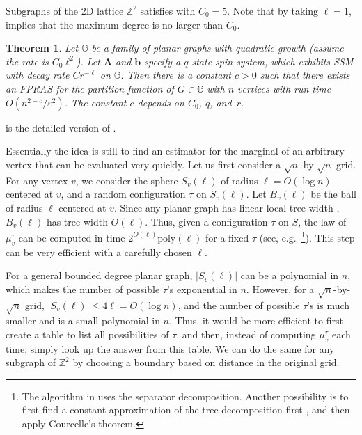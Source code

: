 \documentclass[11pt]{amsart}
\def\=#1{\mathbb{#1}}
\newcommand{\abs}[1]{\ensuremath{\left\vert#1\right\vert}}
\newcommand{\eps}{\varepsilon}
\newtheorem{theorem}{Theorem}
\theoremstyle{definition}
\theoremstyle{remark}
\begin{document}
Subgraphs of the 2D lattice $\=Z^2$ satisfies  with $C_0=5$.
Note that by taking $\ell=1$,  implies that the maximum degree is no larger than $C_0$.

\begin{theorem}\label{lattice-counting}
  Let $\=G$ be a family of planar graphs with quadratic growth (assume the rate is $C_0\ell^2$).
  Let ${\bm A}$ and ${\bm b}$ specify a $q$-state spin system, which exhibits SSM with decay rate $Cr^{-\ell}$ on $\=G$.
  Then there is a constant $c>0$ such that there exists an FPRAS for the partition function of $G\in\=G$ with $n$ vertices with run-time $\widetilde{O}(n^{2-c}/\eps^2)$.
  The constant $c$ depends on $C_0$, $q$, and~$r$.
\end{theorem}

 is the detailed version of .

Essentially the idea is still to find an estimator for the marginal of an arbitrary vertex that can be evaluated very quickly.
Let us first consider a $\sqrt{n}$-by-$\sqrt{n}$ grid.
For any vertex $v$, we consider the sphere $S_v(\ell)$ of radius $\ell=O(\log n)$ centered at $v$,
and a random configuration $\tau$ on $S_v(\ell)$.
Let $B_v(\ell)$ be the ball of radius $\ell$ centered at $v$.
Since any planar graph has linear local tree-width \cite{DH04,Epp00},
$B_v(\ell)$ has tree-width $O(\ell)$.
Thus, given a configuration $\tau$ on $S$, 
the law of $\mu_v^{\tau}$ can be computed in time $2^{O(\ell)}\textrm{poly}(\ell)$ for a fixed $\tau$ (see, e.g.~\cite{YZ13}\footnote{The algorithm in \cite{YZ13} uses the separator decomposition. Another possibility is to first find a constant approximation of the tree decomposition first \cite{KT16}, and then apply Courcelle's theorem.}).
This step can be very efficient with a carefully chosen $\ell$.

For a general bounded degree planar graph, $\abs{S_v(\ell)}$ can be a polynomial in $n$, which makes the number of possible $\tau$'s exponential in $n$.
However, for a $\sqrt{n}$-by-$\sqrt{n}$ grid, $\abs{S_v(\ell)}\le 4\ell=O(\log n)$,
and the number of possible $\tau$'s is much smaller and is a small polynomial in $n$.
Thus, it would be more efficient to first create a table to list all possibilities of $\tau$,
and then, instead of computing $\mu_v^{\tau}$ each time,
 simply look up the answer from this table. We can do the same for any subgraph of $\mathbb{Z}^2$ by choosing a boundary based on distance in the original grid. 
\end{document}
